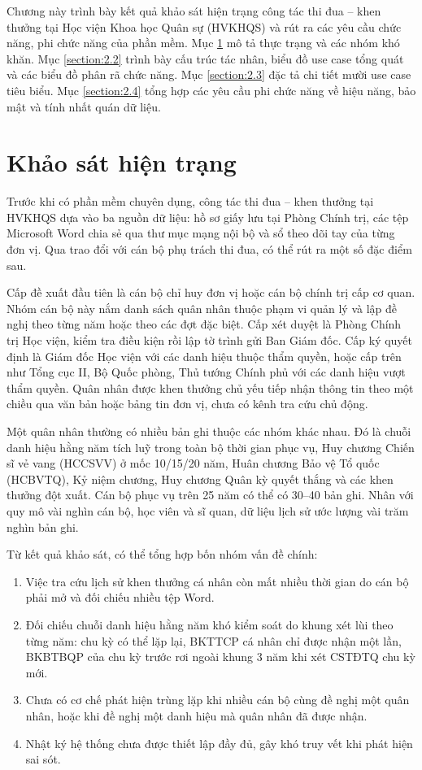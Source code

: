 \documentclass[../DoAn.tex]{subfiles}
\begin{document}
Chương này trình bày kết quả khảo sát hiện trạng công tác thi đua -- khen thưởng tại Học viện Khoa học Quân sự (HVKHQS) và rút ra các yêu cầu chức năng, phi chức năng của phần mềm. Mục \ref{section:2.1} mô tả thực trạng và các nhóm khó khăn. Mục \ref{section:2.2} trình bày cấu trúc tác nhân, biểu đồ use case tổng quát và các biểu đồ phân rã chức năng. Mục \ref{section:2.3} đặc tả chi tiết mười use case tiêu biểu. Mục \ref{section:2.4} tổng hợp các yêu cầu phi chức năng về hiệu năng, bảo mật và tính nhất quán dữ liệu.

\section{Khảo sát hiện trạng}
\label{section:2.1}

Trước khi có phần mềm chuyên dụng, công tác thi đua -- khen thưởng tại HVKHQS dựa vào ba nguồn dữ liệu: hồ sơ giấy lưu tại Phòng Chính trị, các tệp Microsoft Word chia sẻ qua thư mục mạng nội bộ và sổ theo dõi tay của từng đơn vị. Qua trao đổi với cán bộ phụ trách thi đua, có thể rút ra một số đặc điểm sau.

Cấp đề xuất đầu tiên là cán bộ chỉ huy đơn vị hoặc cán bộ chính trị cấp cơ quan. Nhóm cán bộ này nắm danh sách quân nhân thuộc phạm vi quản lý và lập đề nghị theo từng năm hoặc theo các đợt đặc biệt. Cấp xét duyệt là Phòng Chính trị Học viện, kiểm tra điều kiện rồi lập tờ trình gửi Ban Giám đốc. Cấp ký quyết định là Giám đốc Học viện với các danh hiệu thuộc thẩm quyền, hoặc cấp trên như Tổng cục II, Bộ Quốc phòng, Thủ tướng Chính phủ với các danh hiệu vượt thẩm quyền. Quân nhân được khen thưởng chủ yếu tiếp nhận thông tin theo một chiều qua văn bản hoặc bảng tin đơn vị, chưa có kênh tra cứu chủ động.

Một quân nhân thường có nhiều bản ghi thuộc các nhóm khác nhau. Đó là chuỗi danh hiệu hằng năm tích luỹ trong toàn bộ thời gian phục vụ, Huy chương Chiến sĩ vẻ vang (HCCSVV) ở mốc 10/15/20 năm, Huân chương Bảo vệ Tổ quốc (HCBVTQ), Kỷ niệm chương, Huy chương Quân kỳ quyết thắng và các khen thưởng đột xuất. Cán bộ phục vụ trên 25 năm có thể có 30--40 bản ghi. Nhân với quy mô vài nghìn cán bộ, học viên và sĩ quan, dữ liệu lịch sử ước lượng vài trăm nghìn bản ghi.

Từ kết quả khảo sát, có thể tổng hợp bốn nhóm vấn đề chính:

\begin{enumerate}
    \item Việc tra cứu lịch sử khen thưởng cá nhân còn mất nhiều thời gian do cán bộ phải mở và đối chiếu nhiều tệp Word.
    \item Đối chiếu chuỗi danh hiệu hằng năm khó kiểm soát do khung xét lùi theo từng năm: chu kỳ có thể lặp lại, BKTTCP cá nhân chỉ được nhận một lần, BKBTBQP của chu kỳ trước rơi ngoài khung 3 năm khi xét CSTĐTQ chu kỳ mới.
    \item Chưa có cơ chế phát hiện trùng lặp khi nhiều cán bộ cùng đề nghị một quân nhân, hoặc khi đề nghị một danh hiệu mà quân nhân đã được nhận.
    \item Nhật ký hệ thống chưa được thiết lập đầy đủ, gây khó truy vết khi phát hiện sai sót.
\end{enumerate}
\end{document}
